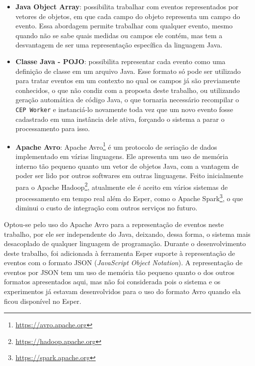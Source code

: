 \begin{itemize}
\item \textbf{Java Object Array}: possibilita trabalhar com eventos representados por vetores de objetos, em que cada campo do objeto representa um campo do evento. Essa abordagem permite trabalhar com qualquer evento, mesmo quando não se sabe quais medidas ou campos ele contém, mas tem a desvantagem de ser uma representação específica da linguagem Java.
\item \textbf{Classe Java - POJO}: possibilita representar cada evento como uma definição de classe em um arquivo Java. Esse formato só pode ser utilizado para tratar eventos em um contexto no qual os campos já são previamente conhecidos, o que não condiz com a proposta deste trabalho, ou utilizando geração automática de código Java, o que tornaria necessário recompilar o \texttt{CEP Worker} e instanciá-lo novamente toda vez que um novo evento fosse cadastrado em uma instância dele ativa, forçando o sistema a parar o processamento para isso.
\item \textbf{Apache Avro}: Apache Avro\footnote{\url{https://avro.apache.org}} é um protocolo de seriação de dados implementado em várias linguagens. Ele apresenta um uso de memória interno tão pequeno quanto um vetor de objetos Java, com a vantagem de poder ser lido por outros softwares em outras linguagens. Feito inicialmente para o Apache Hadoop\footnote{\url{https://hadoop.apache.org}}, atualmente ele é aceito em vários sistemas de processamento em tempo real além do Esper, como o Apache Spark\footnote{\url{https://spark.apache.org}}, o que diminui o custo de integração com outros serviços no futuro.
\end{itemize}

Optou-se pelo uso do Apache Avro para a representação de eventos neste trabalho, por ele ser independente do Java, deixando, dessa forma,  o sistema mais desacoplado de qualquer linguagem de programação. 
Durante o desenvolvimento deste trabalho, foi adicionada à ferramenta Esper suporte à representação de eventos com o formato JSON (\textit{JavaScript Object Notation}). A representação de eventos por JSON tem um uso de memória tão pequeno quanto o dos outros formatos apresentados aqui, mas não foi  considerada pois o sistema e os experimentos já estavam desenvolvidos para o uso do formato Avro quando ela ficou disponível no Esper. 


